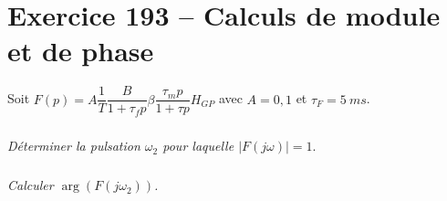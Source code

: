 \section*{Exercice 193 -- Calculs de module et de phase}
\setcounter{exo}{0}


Soit $F(p)=A\dfrac{1}{T}\dfrac{B}{1+\tau_f p}\beta \dfrac{\tau_m p}{1+\tau p} H_{GP}$ avec $A=0,1$ et $\tau_F=\SI{5}{ms}$.


\subparagraph{}
\textit{Déterminer la pulsation $\omega_2$ pour laquelle $\left| F(j\omega) \right|=1.$}

\subparagraph{}
\textit{Calculer $\arg \left(F(j\omega_2)\right)$.}

